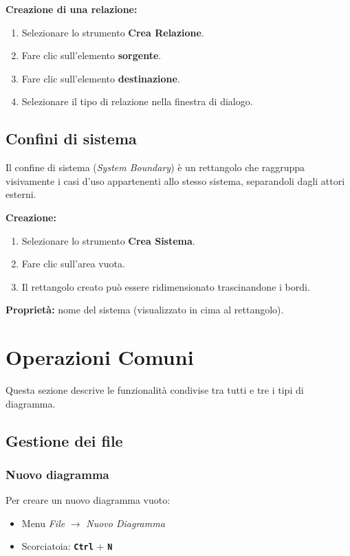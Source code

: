\documentclass[a4paper,11pt]{article}
\newcommand{\key}[1]{\texttt{\textbf{#1}}}
\newcommand{\menu}[1]{\textit{#1}}
\newcommand{\uielement}[1]{\textbf{#1}}
\begin{document}
\textbf{Creazione di una relazione:}
\begin{enumerate}
  \item Selezionare lo strumento \uielement{Crea Relazione}.
  \item Fare clic sull'elemento \textbf{sorgente}.
  \item Fare clic sull'elemento \textbf{destinazione}.
  \item Selezionare il tipo di relazione nella finestra di dialogo.
\end{enumerate}

\subsection{Confini di sistema}

Il confine di sistema (\textit{System Boundary}) è un rettangolo che raggruppa visivamente i
casi d'uso appartenenti allo stesso sistema, separandoli dagli attori esterni.

\textbf{Creazione:}
\begin{enumerate}
  \item Selezionare lo strumento \uielement{Crea Sistema}.
  \item Fare clic sull'area vuota.
  \item Il rettangolo creato può essere ridimensionato trascinandone i bordi.
\end{enumerate}

\textbf{Proprietà:} nome del sistema (visualizzato in cima al rettangolo).

\section{Operazioni Comuni}
\label{sec:comuni}

Questa sezione descrive le funzionalità condivise tra tutti e tre i tipi di diagramma.

\subsection{Gestione dei file}

\subsubsection{Nuovo diagramma}

Per creare un nuovo diagramma vuoto:
\begin{itemize}
  \item Menu \menu{File} $\to$ \menu{Nuovo Diagramma}
  \item Scorciatoia: \key{Ctrl} + \key{N}
\end{itemize}
\end{document}
